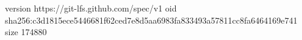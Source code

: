 version https://git-lfs.github.com/spec/v1
oid sha256:c3d1815ece5446681f62ced7e8d5aa6983fa833493a57811cc8fa6464169e741
size 174880
